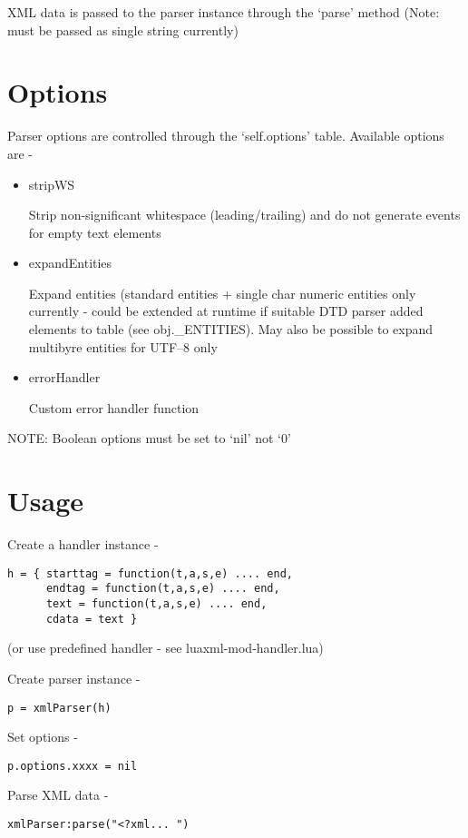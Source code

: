 \documentclass{ltxdoc}
\begin{document}
XML data is passed to the parser instance through the `parse' method
(Note: must be passed as single string currently)

\section{Options}

Parser options are controlled through the `self.options' table.
Available options are -

\begin{itemize}
\item
  stripWS

  Strip non-significant whitespace (leading/trailing) and do not
  generate events for empty text elements
\item
  expandEntities

  Expand entities (standard entities + single char numeric entities only
  currently - could be extended at runtime if suitable DTD parser added
  elements to table (see obj.\_ENTITIES). May also be possible to expand
  multibyre entities for UTF--8 only
\item
  errorHandler

  Custom error handler function
\end{itemize}
NOTE: Boolean options must be set to `nil' not `0'

\section{Usage}

Create a handler instance -

\begin{verbatim}
h = { starttag = function(t,a,s,e) .... end,
      endtag = function(t,a,s,e) .... end,
      text = function(t,a,s,e) .... end,
      cdata = text }
\end{verbatim}
(or use predefined handler - see luaxml-mod-handler.lua)

Create parser instance -

\begin{verbatim}
p = xmlParser(h)
\end{verbatim}
Set options -

\begin{verbatim}
p.options.xxxx = nil
\end{verbatim}
Parse XML data -

\begin{verbatim}
xmlParser:parse("<?xml... ")
\end{verbatim}
\end{document}
